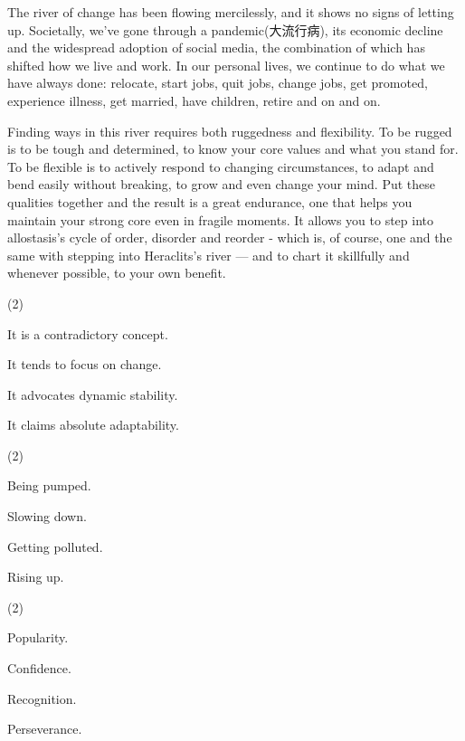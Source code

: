 \documentclass{英语试卷}
\begin{document}
\par The river of change has been flowing mercilessly, and it shows no signs of letting up. Societally, we've gone through a pandemic(大流行病), its economic decline and the widespread adoption of social media, the combination of which has shifted how we live and work. In our personal lives, we continue to do what we have always done: relocate, start jobs, quit jobs, change jobs, get promoted, experience illness, get married, have children, retire and on and on.\par
\par Finding ways in this river requires both ruggedness and flexibility. To be rugged is to be tough and determined, to know your core values and what you stand for. To be flexible is to actively respond to changing circumstances, to adapt and bend easily without breaking, to grow and even change your mind. Put these qualities together and the result is a great endurance, one that helps you maintain your strong core even in fragile moments. It allows you to step into allostasis's cycle of order, disorder and reorder - which is, of course, one and the same with stepping into Heraclits's river — and to chart it skillfully and whenever possible, to your own benefit.\par
{}
\begin{choices}(2)
  \item It is a contradictory concept.
  \item It tends to focus on change.
  \item It advocates dynamic stability.
  \item It claims absolute adaptability.
\end{choices}
\begin{choices}(2)
  \item Being pumped.
  \item Slowing down.
  \item Getting polluted.
  \item Rising up.
\end{choices}
\begin{choices}(2)
  \item Popularity.
  \item Confidence.
  \item Recognition.
  \item Perseverance.
\end{choices}
\end{document}
